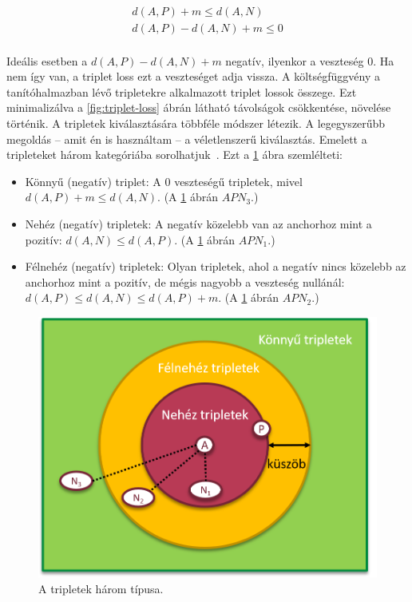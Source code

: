 \begin{equation}\label{eq:5}
\begin{aligned}
d(A, P) + m \le d(A, N) \\
d(A, P) - d(A, N) + m \le 0
\end{aligned}
\end{equation}
\ \\
Ideális esetben a $d(A, P) - d(A, N) + m$ negatív, ilyenkor a veszteség 0. Ha nem így van, a triplet loss ezt a veszteséget adja vissza. A költségfüggvény a tanítóhalmazban lévő tripletekre alkalmazott triplet lossok összege. Ezt minimalizálva a \ref{fig:triplet-loss} ábrán látható távolságok csökkentése, növelése történik.
\newline
\newline
A tripletek kiválasztására többféle módszer létezik. A legegyszerűbb megoldás
-- amit én is használtam -- a véletlenszerű kiválasztás. Emelett a tripleteket három kategóriába sorolhatjuk~\cite{triplet_semi_hard}\cite{triplet_github}. Ezt a \ref{fig:triplet-type} ábra szemlélteti:
\begin{itemize}
	\item Könnyű (negatív) triplet: A 0 veszteségű tripletek, mivel $d(A, P) + m \le d(A, N)$. (A \ref{fig:triplet-type} ábrán $APN_3$.)
	\item Nehéz (negatív) tripletek: A negatív közelebb van az anchorhoz mint a pozitív: $d(A, N) \le d(A, P)$. (A \ref{fig:triplet-type} ábrán $APN_1$.)
	\item Félnehéz (negatív) tripletek: Olyan tripletek, ahol a negatív nincs közelebb az anchorhoz mint a pozitív, de mégis nagyobb a veszteség nullánál: $d(A, P) \le d(A, N) \le d(A, P) + m$. (A \ref{fig:triplet-type} ábrán $APN_2$.)
\end{itemize}

\begin{figure}[!ht]
	\centering
	\includegraphics[width=130mm, keepaspectratio]{figures/triplet_own.png}
	\caption{A tripletek három típusa.}
	\label{fig:triplet-type}
\end{figure}

